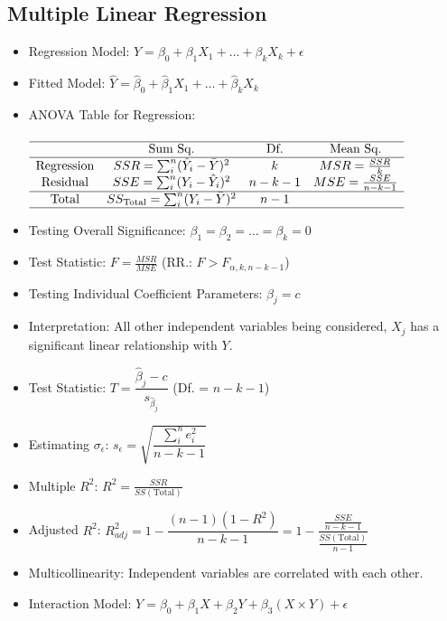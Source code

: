 \documentclass[%
 aip,
 jmp,%
 amsmath,amssymb,
 reprint,%
]{revtex4-1}
\begin{document}
\subsection{Multiple Linear Regression}
\begin{itemize}[label={}]
\item Regression Model: $Y=\beta_0+\beta_1X_1+\dots+\beta_kX_k+\epsilon$
\item Fitted Model: $\hat{Y}=\hat{\beta}_0+\hat{\beta}_1X_1+\dots+\hat{\beta}_kX_k$
\item ANOVA Table for Regression:\\\\
{\footnotesize
$\begin{array}{cccc}
\hline
& \textrm{Sum Sq.} & \textrm{Df.} & \textrm{Mean Sq.} \\
\hline
\textrm{Regression} & SSR=\sum_{i}^n (\hat{Y}_i-\bar{Y})^2 & k & MSR=\frac{SSR}{k} \\
\textrm{Residual} & SSE=\sum_{i}^n (Y_i-\hat{Y}_i)^2 & n-k-1 & MSE=\frac{SSE}{n-k-1} \\
\hline
\textrm{Total} & SS_{\textrm{Total}}=\sum_{i}^n (Y_i-\bar{Y})^2 & n-1 \\
\hline
\end{array}
$}
\item Testing Overall Significance: {\small $\beta_1=\beta_2=\dots=\beta_k=0$}
\item Test Statistic: $F=\frac{MSR}{MSE}$ {\small (RR.: $F > F_{\alpha,k,n-k-1}$)}
\item Testing Individual Coefficient Parameters: $\beta_j=c$
\item {\footnotesize Interpretation: All other independent variables being  considered, $X_j$ has a significant linear relationship with $Y$.}
\item Test Statistic: $T=\dfrac{\hat{\beta}_j-c}{s_{\hat{\beta}_j}}$ {\small (Df. = $n-k-1$)}
\item Estimating $\sigma_{\epsilon}$: $s_{\epsilon} = \sqrt{\dfrac{\sum_{i}^n e_i^2}{n-k-1}}$
\item Multiple $R^2$: $R^2=\frac{SSR}{SS(\textrm{Total})}$
\item Adjusted $R^2$: {\footnotesize  $R_{adj}^2=1-\dfrac{(n-1)(1-R^2)}{n-k-1}=1-\dfrac{\frac{SSE}{n-k-1}}{\frac{SS(\textrm{Total})}{n-1}}$}
\item Multicollinearity: Independent variables are correlated with each other.
\item Interaction Model: {\footnotesize $Y=\beta_0+\beta_1X+\beta_2Y+\beta_3(X\times Y)+\epsilon$}
\end{itemize}
\end{document}
